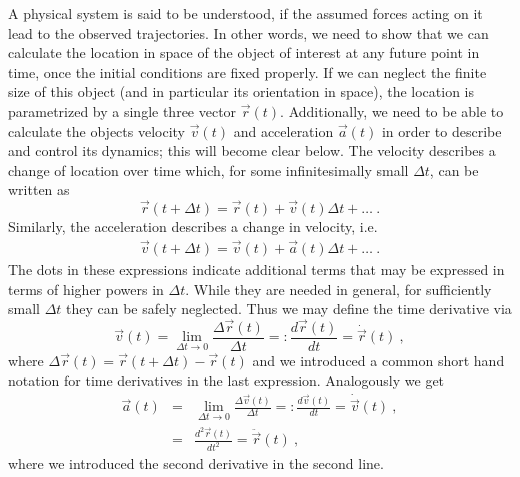 \documentclass[12pt,ngerman,american]{iopart}
\begin{document}
A physical system is said to be understood, if the assumed forces acting on it lead to the observed trajectories.
In other words, we need to show that we can calculate the location in space of the object of interest at any future point in time, once the initial conditions are fixed properly.
If we can neglect the finite size of this object (and in particular its orientation in space), the location is parametrized by a single three vector $\vec r(t)$.
Additionally, we need to be able to calculate the objects velocity $\vec v(t)$ and acceleration $\vec a(t)$ in order to describe and control its dynamics; this will become clear below. The velocity describes a change of location over time which, for some infinitesimally small $\Delta t$, can be written as
\begin{equation}\label{eq:x_update}
\vec r(t+\Delta t) = \vec r(t) + \vec v(t) \Delta t + \ldots \ . \label{eq:vdef}
\end{equation}
Similarly, the acceleration describes a change in velocity, i.e.
\begin{eqnarray}\label{eq:v_update}
\vec v(t+\Delta t) = \vec v(t) + \vec a(t) \Delta t + \ldots\ . \label{eq:adef}
\end{eqnarray}
The dots in these expressions indicate additional terms that may be expressed in terms of higher powers in $\Delta t$. While they are needed in general, for sufficiently small $\Delta t$ they can be safely neglected.
Thus we may define the time derivative via
\begin{equation}
\vec v(t) = \lim_{\Delta t\to 0} \frac{\Delta \vec r(t)}{\Delta t} =: \frac{d\vec r(t)}{d t}  = \dot{\vec  r}(t) \ ,
\end{equation}
where $\Delta \vec r(t)=\vec r(t+\Delta t)-\vec r(t)$ and we introduced a common short hand notation for time derivatives in the last expression.
Analogously we get
\begin{eqnarray}
\vec a(t) &=& \lim_{\Delta t\to 0} \frac{\Delta \vec v(t)}{\Delta t} =: \frac{d\vec v(t)}{dt}  = \dot{\vec v}(t) \ , \\
 &=& \frac{d^2\vec r(t)}{dt^2}  = \ddot{\vec r}(t) \ ,
\end{eqnarray}
where we introduced the second derivative in the second line.
\end{document}
